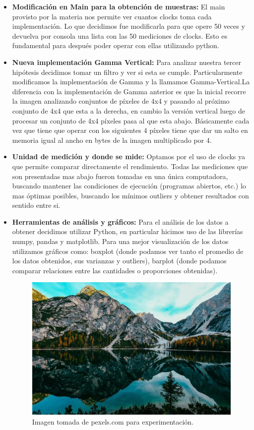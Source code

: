 \documentclass[a4paper]{article}
\begin{document}
\begin{itemize}
    \item \textbf{Modificación en Main para la obtención de muestras:} El main provisto por la materia nos permite ver cuantos clocks toma cada implementación. Lo que decidimos fue modificarla para que opere 50 veces y devuelva por consola una lista con las 50 mediciones de clocks. Esto es fundamental para después poder operar con ellas utilizando python.
    \item \textbf{Nueva implementación Gamma Vertical:} Para analizar nuestra tercer hipótesis decidimos tomar un filtro y ver si esta se cumple. Particularmente modificamos la implementación de Gamma y la llamamos Gamma-Vertical.La diferencia con la implementación de Gamma anterior es que la inicial recorre la imagen analizando conjuntos de píxeles de 4x4 y pasando al próximo conjunto de 4x4 que esta a la derecha, en cambio la versión vertical luego de procesar un conjunto de 4x4 píxeles pasa al que esta abajo. Básicamente cada vez que tiene que operar con los siguientes 4 píxeles tiene que dar un salto en memoria igual al ancho en bytes de la imagen multiplicado por 4.
    \item \textbf{Unidad de medición y donde se mide: } Optamos por el uso de clocks ya que permite comparar directamente el rendimiento. Todas las mediciones que son presentadas mas abajo fueron tomadas en una única computadora, buscando mantener las condiciones de ejecución (programas abiertos, etc.) lo mas óptimas posibles, buscando los mínimos outliers y obtener resultados con sentido entre si.
    \item \textbf{Herramientas de análisis y gráficos:} Para el análisis de los datos a obtener decidimos utilizar Python, en particular hicimos uso de las librerías numpy, pandas y matplotlib. Para una mejor visualización de los datos utilizamos gráficos como: boxplot (donde podamos ver tanto el promedio de los datos obtenidos, sus varianzas y outliers), barplot (donde podamos comparar relaciones entre las cantidades o proporciones obtenidas).
    \begin{figure}[htp]
    \centering
    \includegraphics[scale=.5]{pexels-francesco-ungaro-1525041_50_1_20.jpg}
    \caption{Imagen tomada de pexels.com para experimentación.}
    \label{fig:galaxy}
\end{figure}
    
\end{itemize}
\end{document}
